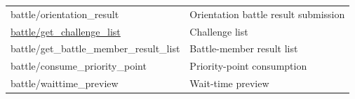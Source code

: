 \begin{longtable}{>{\ttfamily}p{}p{}}
battle/orientation\_result
    & Orientation battle result submission \\

\hyperref[subsec:api_battle_get_challenge_list]
    {battle/get\_challenge\_list}
    & Challenge list \\

battle/get\_battle\_member\_result\_list
    & Battle-member result list \\

battle/consume\_priority\_point
    & Priority-point consumption \\

battle/waittime\_preview
    & Wait-time preview \\

\bottomrule
\end{longtable}